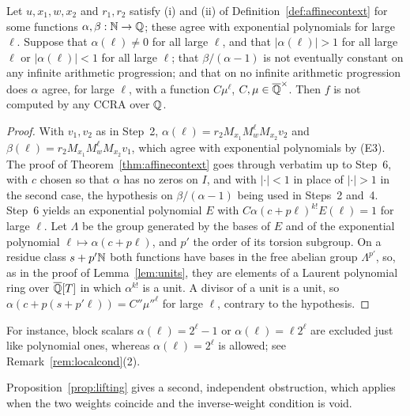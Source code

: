 \begin{theorem}\label{thm:affinegeneral}
Let $u,x_1,w,x_2$ and $r_1,r_2$ satisfy (i) and (ii) of Definition~\ref{def:affinecontext} for some functions $\alpha,\beta:\mathbb{N}\to\mathbb{Q}$; these agree with exponential polynomials for large $\ell$. Suppose that $\alpha(\ell)\ne0$ for all large $\ell$, and that $|\alpha(\ell)|>1$ for all large $\ell$ or $|\alpha(\ell)|<1$ for all large $\ell$; that $\beta/(\alpha-1)$ is not eventually constant on any infinite arithmetic progression; and that on no infinite arithmetic progression does $\alpha$ agree, for large $\ell$, with a function $C\mu^\ell$, $C,\mu\in\overline{\mathbb{Q}}^\times$. Then $f$ is not computed by any CCRA over $\mathbb{Q}$.
\end{theorem}
\begin{proof}
With $v_1,v_2$ as in Step~2, $\alpha(\ell)=r_2M_{x_1}M_w^\ell M_{x_2}v_2$ and $\beta(\ell)=r_2M_{x_1}M_w^\ell M_{x_2}v_1$, which agree with exponential polynomials by (E3). The proof of Theorem~\ref{thm:affinecontext} goes through verbatim up to Step~6, with $c$ chosen so that $\alpha$ has no zeros on $I$, and with $|\cdot|<1$ in place of $|\cdot|>1$ in the second case, the hypothesis on $\beta/(\alpha-1)$ being used in Steps~2 and~4. Step~6 yields an exponential polynomial $E$ with $C\alpha(c+p\ell)^{k!}E(\ell)=1$ for large $\ell$. Let $\Lambda$ be the group generated by the bases of $E$ and of the exponential polynomial $\ell\mapsto\alpha(c+p\ell)$, and $p'$ the order of its torsion subgroup. On a residue class $s+p'\mathbb{N}$ both functions have bases in the free abelian group $\Lambda^{p'}$, so, as in the proof of Lemma~\ref{lem:units}, they are elements of a Laurent polynomial ring over $\overline{\mathbb{Q}}[T]$ in which $\alpha^{k!}$ is a unit. A divisor of a unit is a unit, so $\alpha(c+p(s+p'\ell))=C''\mu''^\ell$ for large $\ell$, contrary to the hypothesis.
\end{proof}
For instance, block scalars $\alpha(\ell)=2^\ell-1$ or $\alpha(\ell)=\ell2^\ell$ are excluded just like polynomial ones, whereas $\alpha(\ell)=2^\ell$ is allowed; see Remark~\ref{rem:localcond}(2).

Proposition~\ref{prop:lifting} gives a second, independent obstruction, which applies when the two weights coincide and the inverse-weight condition is void.

